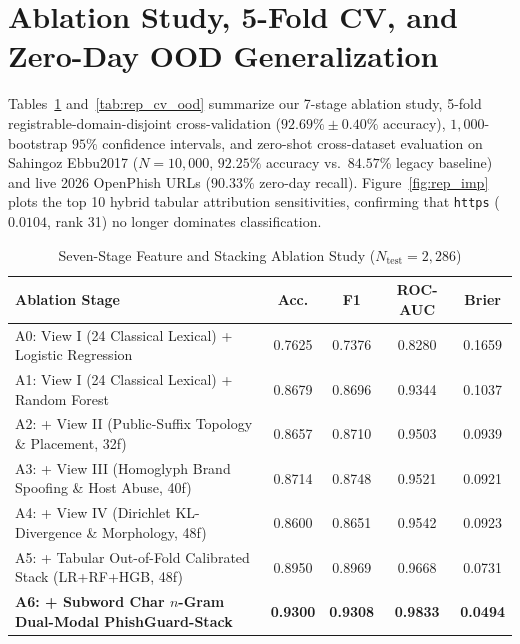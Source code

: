 \documentclass[12pt,a4paper]{report}
\begin{document}
\section{Ablation Study, 5-Fold CV, and Zero-Day OOD Generalization}
Tables~\ref{tab:rep_ablation} and~\ref{tab:rep_cv_ood} summarize our 7-stage ablation study, 5-fold registrable-domain-disjoint cross-validation ($92.69\% \pm 0.40\%$ accuracy), $1{,}000$-bootstrap $95\%$ confidence intervals, and zero-shot cross-dataset evaluation on Sahingoz Ebbu2017 ($N=10{,}000$, $92.25\%$ accuracy vs.\ $84.57\%$ legacy baseline) and live 2026 OpenPhish URLs ($90.33\%$ zero-day recall). Figure~\ref{fig:rep_imp} plots the top 10 hybrid tabular attribution sensitivities, confirming that \texttt{https} ($0.0104$, rank 31) no longer dominates classification.

\begin{table}[htbp]
\caption{Seven-Stage Feature and Stacking Ablation Study ($N_{\text{test}}=2{,}286$)}
\label{tab:rep_ablation}
\centering
\footnotesize
\begin{tabular}{p{8.2cm}cccc}
\toprule
\textbf{Ablation Stage} & \textbf{Acc.} & \textbf{F1} & \textbf{ROC-AUC} & \textbf{Brier} \\
\midrule
A0: View I (24 Classical Lexical) + Logistic Regression & 0.7625 & 0.7376 & 0.8280 & 0.1659 \\
A1: View I (24 Classical Lexical) + Random Forest & 0.8679 & 0.8696 & 0.9344 & 0.1037 \\
A2: + View II (Public-Suffix Topology \& Placement, 32f) & 0.8657 & 0.8710 & 0.9503 & 0.0939 \\
A3: + View III (Homoglyph Brand Spoofing \& Host Abuse, 40f) & 0.8714 & 0.8748 & 0.9521 & 0.0921 \\
A4: + View IV (Dirichlet KL-Divergence \& Morphology, 48f) & 0.8600 & 0.8651 & 0.9542 & 0.0923 \\
A5: + Tabular Out-of-Fold Calibrated Stack (LR+RF+HGB, 48f) & 0.8950 & 0.8969 & 0.9668 & 0.0731 \\
\textbf{A6: + Subword Char $n$-Gram Dual-Modal PhishGuard-Stack} & \textbf{0.9300} & \textbf{0.9308} & \textbf{0.9833} & \textbf{0.0494} \\
\bottomrule
\end{tabular}
\end{table}
\end{document}
